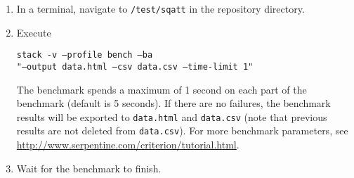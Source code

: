 \begin{enumerate}
\item In a terminal, navigate to \texttt{/test/sqatt} in the repository directory.
\item Execute
\begin{center}
\texttt{stack -v --profile bench --ba} \\
\texttt{"--output data.html --csv data.csv --time-limit 1"}
\end{center}

The benchmark spends a maximum of 1 second on each part of the benchmark (default is 5 seconds).
If there are no failures, the benchmark results will be exported to \texttt{data.html} and \texttt{data.csv} (note that previous results are not deleted from \texttt{data.csv}).
For more benchmark parameters, see \url{http://www.serpentine.com/criterion/tutorial.html}.

\item Wait for the benchmark to finish.
\end{enumerate}

